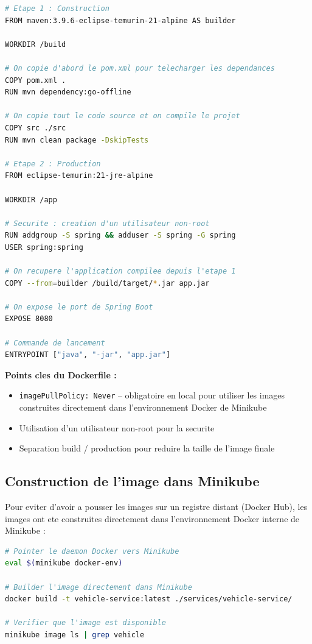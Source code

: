 \documentclass[12pt,a4paper]{article}
\begin{document}
\begin{lstlisting}[language=bash, caption=Dockerfile multi-stage - vehicle-service (Spring Boot)]
# Etape 1 : Construction
FROM maven:3.9.6-eclipse-temurin-21-alpine AS builder

WORKDIR /build

# On copie d'abord le pom.xml pour telecharger les dependances
COPY pom.xml .
RUN mvn dependency:go-offline

# On copie tout le code source et on compile le projet
COPY src ./src
RUN mvn clean package -DskipTests

# Etape 2 : Production
FROM eclipse-temurin:21-jre-alpine

WORKDIR /app

# Securite : creation d'un utilisateur non-root
RUN addgroup -S spring && adduser -S spring -G spring
USER spring:spring

# On recupere l'application compilee depuis l'etape 1
COPY --from=builder /build/target/*.jar app.jar

# On expose le port de Spring Boot
EXPOSE 8080

# Commande de lancement
ENTRYPOINT ["java", "-jar", "app.jar"]
\end{lstlisting}

\textbf{Points cles du Dockerfile :}
\begin{itemize}
  \item \texttt{imagePullPolicy: Never} -- obligatoire en local pour utiliser les images
        construites directement dans l'environnement Docker de Minikube
  \item Utilisation d'un utilisateur non-root pour la securite
  \item Separation build / production pour reduire la taille de l'image finale
\end{itemize}

\subsection{Construction de l'image dans Minikube}

Pour eviter d'avoir a pousser les images sur un registre distant (Docker Hub), les images
ont ete construites directement dans l'environnement Docker interne de Minikube :

\begin{lstlisting}[language=bash, caption=Construction de l'image dans Minikube]
# Pointer le daemon Docker vers Minikube
eval $(minikube docker-env)

# Builder l'image directement dans Minikube
docker build -t vehicle-service:latest ./services/vehicle-service/

# Verifier que l'image est disponible
minikube image ls | grep vehicle
\end{lstlisting}
\end{document}

